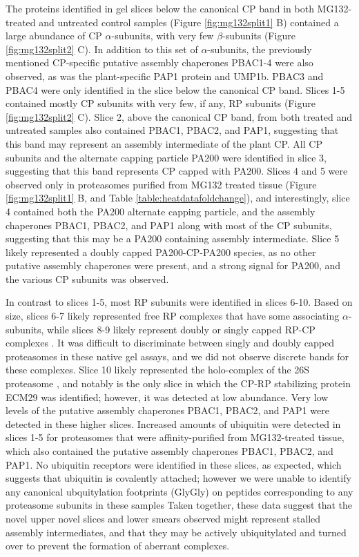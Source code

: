 The proteins identified in gel slices below the canonical CP band in both MG132-treated and untreated control samples (Figure \ref{fig:mg132split1} B) contained a large abundance of CP $\alpha$-subunits, with very few $\beta$-subunits (Figure \ref{fig:mg132split2} C). In addition to this set of $\alpha$-subunits, the previously mentioned CP-specific putative assembly chaperones PBAC1-4 were also observed, as was the plant-specific PAP1 protein and UMP1b. PBAC3 and PBAC4 were only identified in the slice below the canonical CP band. Slices 1-5 contained mostly CP subunits with very few, if any, RP subunits (Figure \ref{fig:mg132split2} C). Slice 2, above the canonical CP band, from both treated and untreated samples also contained PBAC1, PBAC2, and PAP1, suggesting that this band may represent an assembly intermediate of the plant CP. All CP subunits and the alternate capping particle PA200 were identified in slice 3, suggesting that this band represents CP capped with PA200. Slices 4 and 5 were observed only in proteasomes purified from MG132 treated tissue (Figure \ref{fig:mg132split1} B, and Table \ref{table:heatdatafoldchange}), and interestingly, slice 4 contained both the PA200 alternate capping particle, and the assembly chaperones PBAC1, PBAC2, and PAP1 along with most of the CP subunits, suggesting that this may be a PA200 containing assembly intermediate. Slice 5 likely represented a doubly capped PA200-CP-PA200 species, as no other putative assembly chaperones were present, and a strong signal for PA200, and the various CP subunits was observed. 

In contrast to slices 1-5, most RP subunits were identified in slices 6-10. Based on size, slices 6-7 likely represented free RP complexes that have some associating $\alpha$-subunits, while slices 8-9 likely represent doubly or singly capped RP-CP complexes \citep{book10}. It was difficult to discriminate between singly and doubly capped proteasomes in these native gel assays, and we did not observe discrete bands for these complexes. Slice 10 likely represented the holo-complex of the 26S proteasome \citep{book10}, and notably is the only slice in which the CP-RP stabilizing protein ECM29 was identified; however, it was detected at low abundance. Very low levels of the putative assembly chaperones PBAC1, PBAC2, and PAP1 were detected in these higher slices. Increased amounts of ubiquitin were detected in slices 1-5 for proteasomes that were affinity-purified from MG132-treated tissue, which also contained the putative assembly chaperones PBAC1, PBAC2, and PAP1. No ubiquitin receptors were identified in these slices, as expected, which suggests that ubiquitin is covalently attached; however we were unable to identify any canonical ubquitylation footprints (GlyGly) \citep{wang06} on peptides corresponding to any proteasome subunits in these samples  Taken together, these data suggest that the novel upper novel slices and lower smears observed might represent stalled assembly intermediates, and that they may be actively ubiquitylated and turned over to prevent the formation of aberrant complexes.
 
